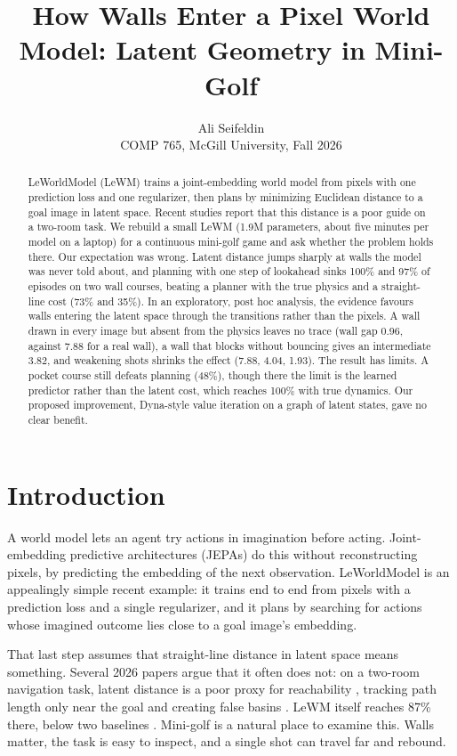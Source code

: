 \documentclass[10pt,twocolumn]{article}
\title{\vspace{-1.5em}\Large\bfseries How Walls Enter a Pixel World Model: Latent Geometry in Mini-Golf}
\author{Ali Seifeldin\\ \normalsize COMP 765, McGill University, Fall 2026}
\date{}
\begin{document}
\maketitle
\vspace{-2.5em}
\begin{abstract}
\noindent LeWorldModel (LeWM) trains a joint-embedding world model from pixels with one prediction loss and one regularizer, then plans by minimizing Euclidean distance to a goal image in latent space. Recent studies report that this distance is a poor guide on a two-room task. We rebuild a small LeWM (1.9M parameters, about five minutes per model on a laptop) for a continuous mini-golf game and ask whether the problem holds there. Our expectation was wrong. Latent distance jumps sharply at walls the model was never told about, and planning with one step of lookahead sinks 100\% and 97\% of episodes on two wall courses, beating a planner with the true physics and a straight-line cost (73\% and 35\%). In an exploratory, post hoc analysis, the evidence favours walls entering the latent space through the transitions rather than the pixels. A wall drawn in every image but absent from the physics leaves no trace (wall gap 0.96, against 7.88 for a real wall), a wall that blocks without bouncing gives an intermediate 3.82, and weakening shots shrinks the effect (7.88, 4.04, 1.93). The result has limits. A pocket course still defeats planning (48\%), though there the limit is the learned predictor rather than the latent cost, which reaches 100\% with true dynamics. Our proposed improvement, Dyna-style value iteration on a graph of latent states, gave no clear benefit.
\end{abstract}

\section{Introduction}
A world model lets an agent try actions in imagination before acting. Joint-embedding predictive architectures (JEPAs) do this without reconstructing pixels, by predicting the embedding of the next observation. LeWorldModel \cite{maes2026lewm} is an appealingly simple recent example: it trains end to end from pixels with a prediction loss and a single regularizer, and it plans by searching for actions whose imagined outcome lies close to a goal image's embedding.

That last step assumes that straight-line distance in latent space means something. Several 2026 papers argue that it often does not: on a two-room navigation task, latent distance is a poor proxy for reachability \cite{you2026ngc,hu2026scale,li2026trm}, tracking path length only near the goal and creating false basins \cite{you2026ngc}. LeWM itself reaches 87\% there, below two baselines \cite{maes2026lewm}. Mini-golf is a natural place to examine this. Walls matter, the task is easy to inspect, and a single shot can travel far and rebound.
\end{document}
